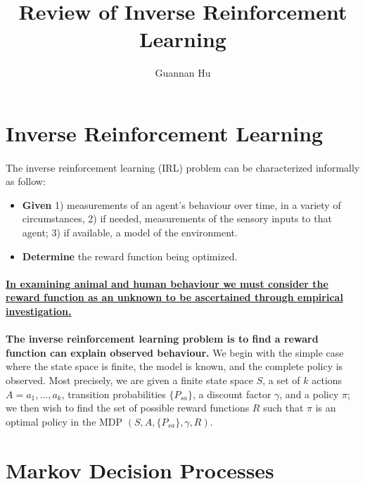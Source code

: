 \documentclass[12pt,a4paper]{article}
\begin{document}
\title{Review of Inverse Reinforcement Learning}
\author{Guannan Hu}
\maketitle

\section{Inverse Reinforcement Learning}
\paragraph{}The inverse reinforcement learning (IRL) problem can be characterized informally as follow:
\begin{itemize}
	\item[] \textbf{Given} 1) measurements of an agent's behaviour over time, in a variety of circumstances, 2) if needed, measurements of the sensory inputs to that agent; 3) if available, a model of the environment.
	\item[] \textbf{Determine} the reward function being optimized.
\end{itemize} 

\paragraph{} \textbf{\uline{In examining animal and human behaviour we must consider the reward function as an unknown to be ascertained through empirical investigation.}}

\paragraph{} 
\begin{tcolorbox}
\textbf{The inverse reinforcement learning problem is to find a reward function can explain observed behaviour.} We begin with the simple case where the state space is finite, the model is known, and the complete policy is observed. Most precisely, we are given a finite state space $S$, a set of $k$ actions $A = {a_1, ..., a_{k}}$, transition probabilities $\{P_{sa}\}$, a discount factor $\gamma$, and a policy $\pi$; we then wish to find the set of possible reward functions $R$ such that $\pi$ is an optimal policy in the MDP $(S, A, \{P_{sa}\}, \gamma, R)$.
\end{tcolorbox}

\section{Markov Decision Processes}
\end{document}
